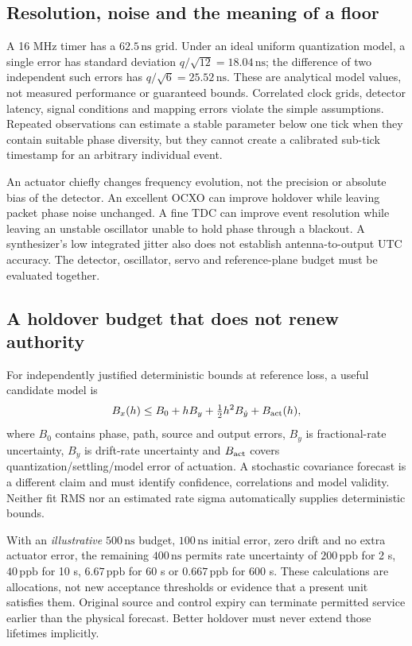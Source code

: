\documentclass[11pt,letterpaper]{article}
\newcommand{\ns}{\,\mathrm{ns}}
\newcommand{\ppb}{\,\mathrm{ppb}}
\begin{document}
\subsection{Resolution, noise and the meaning of a floor}
A 16 MHz timer has a $62.5\ns$ grid. Under an ideal uniform quantization model, a single error has standard deviation $q/\sqrt{12}=18.04\ns$; the difference of two independent such errors has $q/\sqrt6=25.52\ns$. These are analytical model values, not measured performance or guaranteed bounds. Correlated clock grids, detector latency, signal conditions and mapping errors violate the simple assumptions. Repeated observations can estimate a stable parameter below one tick when they contain suitable phase diversity, but they cannot create a calibrated sub-tick timestamp for an arbitrary individual event.

An actuator chiefly changes frequency evolution, not the precision or absolute bias of the detector. An excellent OCXO can improve holdover while leaving packet phase noise unchanged. A fine TDC can improve event resolution while leaving an unstable oscillator unable to hold phase through a blackout. A synthesizer's low integrated jitter also does not establish antenna-to-output UTC accuracy. The detector, oscillator, servo and reference-plane budget must be evaluated together.

\subsection{A holdover budget that does not renew authority}
For independently justified deterministic bounds at reference loss, a useful candidate model is
\begin{equation}
B_x(h)\le B_0+hB_y+\tfrac12h^2B_{\dot y}+B_{\rm act}(h),
\label{eq:hold}
\end{equation}
where $B_0$ contains phase, path, source and output errors, $B_y$ is fractional-rate uncertainty, $B_{\dot y}$ is drift-rate uncertainty and $B_{\rm act}$ covers quantization/settling/model error of actuation. A stochastic covariance forecast is a different claim and must identify confidence, correlations and model validity. Neither fit RMS nor an estimated rate sigma automatically supplies deterministic bounds.

With an \emph{illustrative} $500\ns$ budget, $100\ns$ initial error, zero drift and no extra actuator error, the remaining $400\ns$ permits rate uncertainty of $200\ppb$ for 2 s, $40\ppb$ for 10 s, $6.67\ppb$ for 60 s or $0.667\ppb$ for 600 s. These calculations are allocations, not new acceptance thresholds or evidence that a present unit satisfies them. Original source and control expiry can terminate permitted service earlier than the physical forecast. Better holdover must never extend those lifetimes implicitly.
\end{document}
